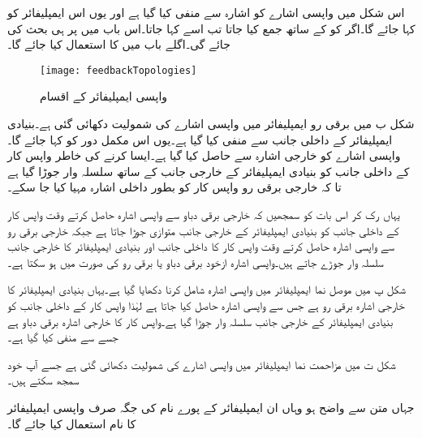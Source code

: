 اس شکل میں واپسی اشارے  کو اشارہ  سے منفی کیا گیا ہے اور یوں اس ایمپلیفائر کو  کہا جائے گا۔اگر   کو  کے ساتھ جمع کیا جاتا تب اسے   کہا جاتا۔اس باب میں  پر ہی بحث کی جائے گی۔اگلے باب میں  کا استعمال کیا جائے گا۔
\begin{figure}
\centering
\texttt{[image: feedbackTopologies]}
\caption{واپسی ایمپلیفائر کے اقسام}
\label{شکل_واپسی_ایمپلیفائر_کے_اقسام}
\end{figure}

شکل  ب میں برقی رو ایمپلیفائر میں واپسی اشارے کی شمولیت دکھائی گئی ہے۔بنیادی ایمپلیفائر کے داخلی جانب  سے  منفی کیا گیا ہے۔یوں اس مکمل دور کو  کہا جائے گا۔واپسی اشارے کو خارجی اشارہ  سے حاصل کیا گیا ہے۔ایسا کرنے کی خاطر واپس کار کے  داخلی جانب کو بنیادی ایمپلیفائر کے خارجی جانب کے ساتھ سلسلہ وار جوڑا گیا ہے تا کہ خارجی برقی رو  واپس کار کو بطور داخلی اشارہ مہیا کیا جا سکے۔

یہاں رک کر اس بات کو سمجھیں کہ خارجی برقی دباو  سے واپسی اشارہ حاصل کرتے وقت واپس کار کے داخلی جانب کو بنیادی ایمپلیفائر کے خارجی جانب  متوازی جوڑا جاتا ہے جبکہ خارجی برقی رو  سے واپسی اشارہ حاصل کرتے وقت واپس کار کا داخلی جانب اور بنیادی ایمپلیفائر کا خارجی جانب سلسلہ وار جوڑے جاتے ہیں۔واپسی اشارہ ازخود برقی دباو یا برقی رو کی صورت میں ہو سکتا ہے۔

شکل  پ میں  موصل نما ایمپلیفائر میں واپسی اشارہ شامل کرنا دکھایا گیا ہے۔یہاں بنیادی ایمپلیفائر کا خارجی اشارہ برقی رو  ہے جس سے واپسی اشارہ حاصل کیا جاتا ہے لہٰذا واپس کار کے داخلی جانب کو بنیادی ایمپلیفائر کے خارجی جانب  سلسلہ وار جوڑا گیا ہے۔واپس کار کا خارجی اشارہ برقی دباو  ہے جسے  سے منفی کیا گیا ہے۔

شکل  ت میں مزاحمت نما ایمپلیفائر میں واپسی اشارے کی شمولیت دکھائی گئی ہے جسے آپ خود سمجھ سکتے ہیں۔

جہاں متن سے واضح ہو وہاں ان ایمپلیفائر کے پورے نام کی جگہ صرف واپسی ایمپلیفائر کا نام استعمال کیا جائے گا۔


